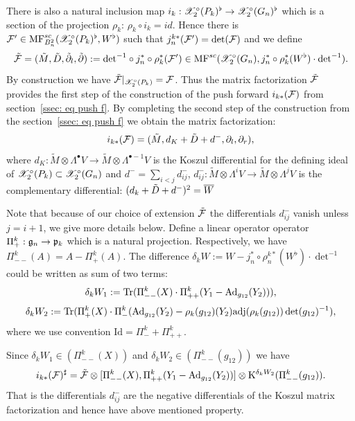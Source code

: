 There is also a natural inclusion map $i_k: \mathscr{X}^\circ_2(P_k)^\flat\to \mathscr{X}^\circ_2(G_n)^\flat$ which is a section of the projection
$\rho_k$: $\rho_k\circ i_{k}=id$.
%
Hence there is $\mathcal{F}'\in \mathrm{MF}^{sc}_{B^2_n}(\mathscr{X}^\circ_2(P_k)^\flat,W^\flat)$ such that $j^{k*}_n(\mathcal{F}')=\det(\mathcal{F})$
and we define \[\tilde{\mathcal{F}}=(\tilde{M},\tilde{D},\tilde{\partial}_l,\tilde{\partial}):=\mathrm{det}^{-1}\circ j^{*}_n\circ \rho_k^*(\mathcal{F}')\in \mathrm{MF}^{sc}(\mathscr{X}^\circ_2(G_n),j_n^{*}\circ{\rho}_{k}^*(W^\flat)\cdot\mathrm{det}^{-1}).\]
By construction we have $\tilde{\mathcal{F}}|_{\mathscr{X}^\circ_2(P_k)}=\mathcal{F}$. Thus the matrix factorization  $\tilde{\mathcal{F}}$ provides the first step of the construction of the push forward
$i_{k*}(\mathcal{F})$ from section~\ref{ssec: eq push f}. By completing the second step of the construction from the section~\ref{ssec: eq push f} we obtain the matrix factorization:
$$ i_{k*}(\mathcal{F})=(\tilde{M},d_K+\tilde{D}+d^-,\partial_l,\partial_r),$$
where $d_K: \tilde{M}\otimes \Lambda^{\bullet} V\to \tilde{M}\otimes \Lambda^{\bullet-1} V$ is the Koszul differential for the
defining ideal of $\mathscr{X}_2^\circ(P_k)\subset \mathscr{X}_2^\circ(G_n)$ and $d^-=\sum_{i<j} d^-_{ij}$,
$d^-_{ij}:\tilde{M}\otimes\Lambda^i V\to \tilde{M}\otimes \Lambda^{j} V$ is the complementary differential: $(d_k+\tilde{D}+d^-)^2=\overline{W}$

Note that because of our choice of extension $\tilde{\mathcal{F}}$ the differentials $d^-_{ij}$ vanish unless $j=i+1$, we give more details below.
Define a linear operator operator $\Pi^k_{+}:\mathfrak{g}_n\to \mathfrak{p}_k$ which is a natural projection. Respectively, we have $\Pi_{--}^k(A)=A-\Pi_+^{k}(A)$.
The difference $\delta_kW:=W-j_n^*\circ\rho_n^{k*}(W^\flat)\cdot \det^{-1}$ could be written as sum of two terms:
$$\delta_kW_1:=\mathop{{\rm Tr}}\nolimits(\Pi_{--}^k(X)\cdot \Pi_{++}^k(Y_1-{\rm Ad}_{g_{12}}(Y_2))),$$
$$\delta_kW_2:=\mathop{{\rm Tr}}\nolimits(\Pi_+^k(X)\cdot
\Pi^k_{-}({\rm Ad}_{g_{12}}(Y_2)-\rho_k(g_{12})(Y_2)\mathrm{adj}(\rho_k(g_{12}))\det(g_{12})^{-1}  ),$$
where we use convention $\mathrm{Id}=\Pi^k_{-}+\Pi^k_{++}$.

Since $\delta_k W_1\in (\Pi^k_{--}(X))$ and $\delta_kW_2\in (\Pi^k_{--}(g_{12}))$ we have
$$ i_{k*}(\mathcal{F})^\sharp=\tilde{\mathcal{F}}\otimes [\Pi_{--}^k(X), \Pi_{++}^k(Y_1-{\rm Ad}_{g_{12}}(Y_2))]\otimes  \mathrm{K}^{\delta_k W_2} (\Pi_{--}^{k}(g_{12})).$$
That is the differentials \(d_{ij}^-\)   are the negative differentials of the Koszul matrix factorization and hence have above mentioned property.




